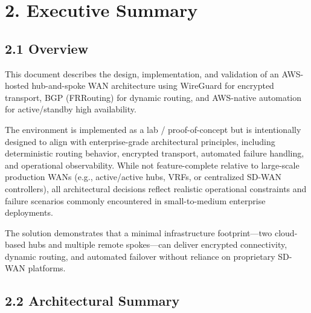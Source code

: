 \documentclass[11pt]{article}
\begin{document}
%
%
%
\section{2. Executive Summary}
\label{sec:executive-summary}

\subsection{2.1 Overview}
\label{sec:overview}

This document describes the design, implementation, and validation of an AWS-hosted hub-and-spoke WAN architecture using WireGuard for encrypted transport, BGP (FRRouting) for dynamic routing, and AWS-native automation for active/standby high availability.

The environment is implemented as a lab / proof-of-concept but is intentionally designed to align with enterprise-grade architectural principles, including deterministic routing behavior, encrypted transport, automated failure handling, and operational observability. While not feature-complete relative to large-scale production WANs (e.g., active/active hubs, VRFs, or centralized SD-WAN controllers), all architectural decisions reflect realistic operational constraints and failure scenarios commonly encountered in small-to-medium enterprise deployments.

The solution demonstrates that a minimal infrastructure footprint—two cloud-based hubs and multiple remote spokes—can deliver encrypted connectivity, dynamic routing, and automated failover without reliance on proprietary SD-WAN platforms.

\subsection{2.2 Architectural Summary}
\label{sec:architectural-summary}
\end{document}
